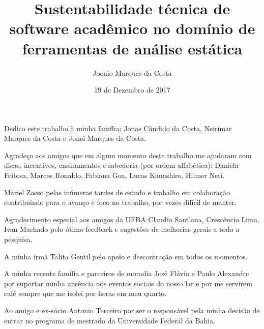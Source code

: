 \documentclass[msc, classic, a4paper]{ufbathesis}
\institute{Instituto de Matemática}
\date{19 de Dezembro de 2017}
\author{Joenio Marques da Costa}
\title{
  Sustentabilidade técnica de software acadêmico no domínio de ferramentas de
  análise estática
}
\begin{document}
\pgcompfrontpage
\frontmatter
\pgcomppresentationpage


\catalogingsheet


\begin{dedicatory}
Dedico este trabalho à minha família:
Jonas Cândido da Costa,
Neirimar Marques da Costa e
Jonei Marques da Costa.
\end{dedicatory}

\acknowledgements
Agradeço aos amigos que em algum momento deste trabalho me ajudaram com dicas,
incentivos, ensinamentos e sabedoria (por ordem alfabética): Daniela Feitosa,
Marcos Ronaldo, Fabiana Goa, Lucas Kanashiro, Hilmer Neri.

Mariel Zasso pelas inúmeras tardes de estudo e trabalho em colaboração
contribuindo para o avanço e foco no trabalho, por vezes difícil de manter.

Agradecimento especial aos amigos da UFBA Claudio Sant'ana, Crescêncio Lima,
Ivan Machado pelo ótimo feedback e sugestões de melhorias gerais a todo a
pesquisa.

A minha irmã Talita Gentil pelo apoio e descontração em todos os momentos.

A minha recente família e parceiros de moradia José Flávio e Paulo Alexandre
por suportar minha ausência nos eventos sociais do nosso lar e por me servirem
café sempre que me isolei por horas em meu quarto.

Ao amigo e ex-sócio Antonio Terceiro por ser o responsável pela minha decisão
de entrar no programa de mestrado da Universidade Federal da Bahia.
\end{document}
